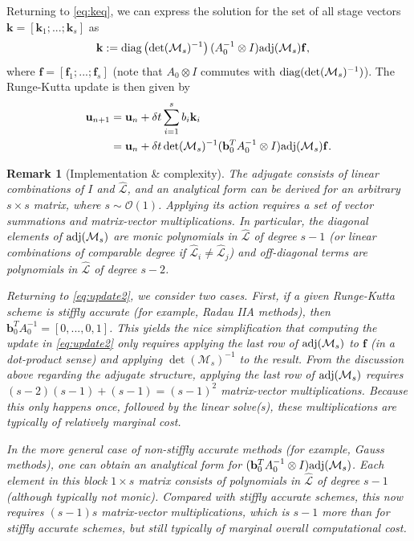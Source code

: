 \documentclass[a4paper,10pt]{article}
\newtheorem{remark}{Remark}
\begin{document}
Returning to \eqref{eq:keq}, we can express the solution for the set of all
stage vectors ${\mathbf{k}} = [\mathbf{k}_1; ...; \mathbf{k}_s]$ as
%
\begin{align*}
\mathbf{k} &:= \textnormal{diag}\left(\det(\mathcal{M}_s)^{-1}\right)
	(A_0^{-1}\otimes I)\textnormal{adj}(\mathcal{M}_s)\mathbf{f},
\end{align*}
%
where $\mathbf{f} = [\mathbf{f}_1; ...; \mathbf{f}_s]$ (note that
$A_0\otimes I$ commutes with $\textnormal{diag}(\det(\mathcal{M}_s)^{-1})$).
The Runge-Kutta update is then given by
%
\begin{align}\nonumber
\mathbf{u}_{n+1} & = \mathbf{u}_n + \delta t\sum_{i=1}^s b_i{\mathbf{k}}_i \\
& = \mathbf{u}_n + \delta t\det(\mathcal{M}_s)^{-1}
	(\mathbf{b}_0^TA_0^{-1}\otimes I)\textnormal{adj}(\mathcal{M}_s)\mathbf{f}.\label{eq:update2}
\end{align}
%

\begin{remark}[Implementation \& complexity]
The adjugate consists of linear combinations of $I$ and $\widehat{\mathcal{L}}$, and an
analytical form can be derived for an arbitrary $s\times s$ matrix, where
$s\sim\mathcal{O}(1)$.
Applying its action requires a set of vector summations
and matrix-vector multiplications. In particular, the diagonal elements of
$\textnormal{adj}(\mathcal{M}_s)$ are monic polynomials in $\widehat{\mathcal{L}}$ of
degree $s-1$ (or linear combinations of comparable degree if
$\widehat{\mathcal{L}}_i\neq\widehat{\mathcal{L}}_j$)
and off-diagonal terms are polynomials in $\widehat{\mathcal{L}}$ of degree $s-2$.

Returning to \eqref{eq:update2}, we consider two cases. First, if a given Runge-Kutta
scheme is stiffly accurate (for example, Radau IIA methods),
then $\mathbf{b}_0^TA_0^{-1} = [0,...,0,1]$. This yields
the nice simplification that computing the update in \eqref{eq:update2} only requires
applying the last row of $\textnormal{adj}(\mathcal{M}_s)$ to $\mathbf{f}$ (in a
dot-product sense) and applying $\det(\mathcal{M}_s)^{-1}$ to the result. From
the discussion above regarding the adjugate structure, applying the last row of
$\textnormal{adj}(\mathcal{M}_s)$ requires $(s-2)(s-1) + (s-1) = (s-1)^2$ matrix-vector
multiplications. Because this only happens once, followed by the linear solve(s),
these multiplications are typically of relatively marginal cost.

In the more general case of non-stiffly accurate methods (for example, Gauss
methods), one can obtain an analytical form for $(\mathbf{b}_0^TA_0^{-1}\otimes
I)\textnormal{adj}(\mathcal{M}_s)$. Each element in this block $1\times s$
matrix consists of polynomials in $\widehat{\mathcal{L}}$ of degree $s-1$
(although typically not monic). Compared with stiffly accurate schemes, this now
requires $(s-1)s$ matrix-vector multiplications, which is $s-1$ more than for
stiffly accurate schemes, but still typically of marginal overall computational
cost.
\end{remark}
\end{document}
